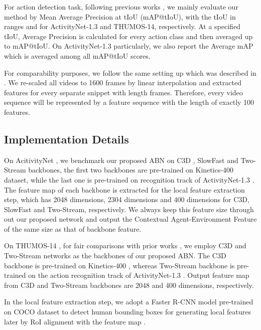 \documentclass{ieeeaccess}
\begin{document}
For action detection task, following previous works \cite{bmn, lin2018bsn}, we mainly evaluate our method by Mean Average Precision at tIoU (mAP@tIoU), with the tIoU in ranges  and  for ActivityNet-1.3 and THUMOS-14, respectively. At a specified tIoU, Average Precision is calculated for every action class and then averaged up to mAP@tIoU. On ActivityNet-1.3 particularly, we also report the Average mAP which is averaged among all mAP@tIoU scores.

For comparability purposes, we follow the same setting up which was described in \cite{bmn}. We re-scaled all videos to 1600 frames by linear interpolation and extracted features for every separate snippet with length  frames. Therefore, every video sequence will be represented by a feature sequence with the length of exactly 100 features.



\subsection{Implementation Details}
On AcitivityNet \cite{caba2015activitynet}, we benchmark our proposed ABN on C3D \cite{C3D_3}, SlowFast \cite{SlowFast} and Two-Stream \cite{2_stream_2} backbones, the first two backbones are pre-trained on Kinetics-400 \cite{Kinetics} dataset, while the last one is pre-trained on recognition track of ActivityNet-1.3 \cite{caba2015activitynet}. The feature map  of each backbone is extracted for the local feature extraction step, which has 2048 dimensions, 2304 dimensions and 400 dimensions for C3D, SlowFast and Two-Stream, respectively. We always keep this feature size through out our proposed network and output the Contextual Agent-Environment Feature of the same size as that of backbone feature.

On THUMOS-14 \cite{THUMOS14}, for fair comparisons with prior works \cite{lin2018bsn, bmn, dbg}, we employ C3D \cite{C3D_3} and Two-Stream \cite{2_stream_2} networks as the backbones of our proposed ABN. The C3D \cite{C3D_3} backbone is pre-trained on Kinetics-400 \cite{Kinetics}, whereas Two-Stream backbone is pre-trained on the action recognition track of ActivityNet-1.3 \cite{caba2015activitynet}. Output feature map  from C3D and Two-Stream backbones are 2048 and 400 dimensions, respectively.

In the local feature extraction step, we adopt a Faster R-CNN \cite{FasterRCNN} model pre-trained on COCO dataset \cite{cocodataset} to detect human bounding boxes for generating local features later by RoI alignment with the feature map .
\end{document}

